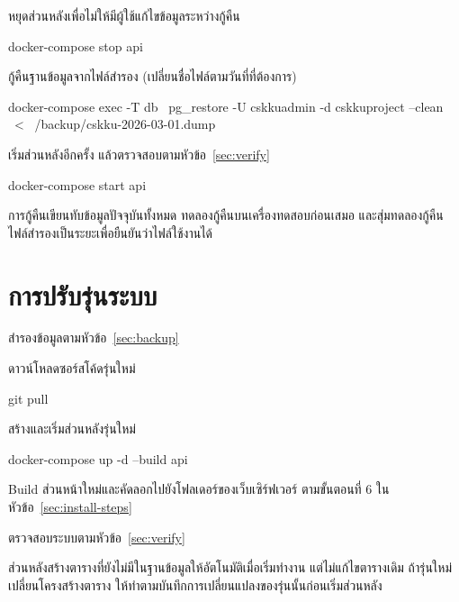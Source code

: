 \begin{steps}
  \item หยุดส่วนหลังเพื่อไม่ให้มีผู้ใช้แก้ไขข้อมูลระหว่างกู้คืน
\begin{terminal}
docker-compose stop api
\end{terminal}
  \item กู้คืนฐานข้อมูลจากไฟล์สำรอง (เปลี่ยนชื่อไฟล์ตามวันที่ที่ต้องการ)
\begin{terminal}
docker-compose exec -T db \
  pg_restore -U cskkuadmin -d cskkuproject --clean \
  < ~/backup/cskku-2026-03-01.dump
\end{terminal}
  \item เริ่มส่วนหลังอีกครั้ง แล้วตรวจสอบตามหัวข้อ~\ref{sec:verify}
\begin{terminal}
docker-compose start api
\end{terminal}
\end{steps}

\begin{warning}
การกู้คืนเขียนทับข้อมูลปัจจุบันทั้งหมด ทดลองกู้คืนบนเครื่องทดสอบก่อนเสมอ
และสุ่มทดลองกู้คืนไฟล์สำรองเป็นระยะเพื่อยืนยันว่าไฟล์ใช้งานได้
\end{warning}

\section{การปรับรุ่นระบบ}
\label{sec:upgrade}

\begin{steps}
  \item สำรองข้อมูลตามหัวข้อ~\ref{sec:backup}
  \item ดาวน์โหลดซอร์สโค้ดรุ่นใหม่
\begin{terminal}
git pull
\end{terminal}
  \item สร้างและเริ่มส่วนหลังรุ่นใหม่
\begin{terminal}
docker-compose up -d --build api
\end{terminal}
  \item Build ส่วนหน้าใหม่และคัดลอกไปยังโฟลเดอร์ของเว็บเซิร์ฟเวอร์ ตามขั้นตอนที่ 6 ในหัวข้อ~\ref{sec:install-steps}
  \item ตรวจสอบระบบตามหัวข้อ~\ref{sec:verify}
\end{steps}

\begin{important}
ส่วนหลังสร้างตารางที่ยังไม่มีในฐานข้อมูลให้อัตโนมัติเมื่อเริ่มทำงาน แต่ไม่แก้ไขตารางเดิม
ถ้ารุ่นใหม่เปลี่ยนโครงสร้างตาราง ให้ทำตามบันทึกการเปลี่ยนแปลงของรุ่นนั้นก่อนเริ่มส่วนหลัง
\end{important}

